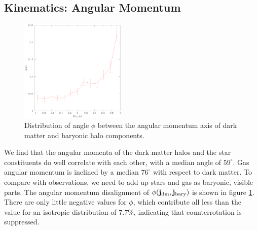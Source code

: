 \documentclass[useAMS,usenatbib]{mn2e}
\begin{document}
\subsection{Kinematics: Angular Momentum}
%
%
\begin{figure}
  \begin{center}
    \includegraphics[width=0.45\textwidth]{fig/j_db/out.eps}
  \end{center}

  \caption{ \label{fig:j_db} Distribution of angle $\phi$ between the angular
    momentum axis of dark matter and baryonic halo components.}
\end{figure}
%
%
We find that the angular momenta of the dark matter halos and the star
constituents do well correlate with each other, with a median angle of
$59^\circ$. Gas angular momentum is inclined by a median $76^\circ$ with
respect to dark matter. To compare with observations, we need to add up stars
and gas as baryonic, visible parts. The angular momentum disalignment of
$\phi(\mathbf{j}_{\rm dm},\mathbf{j}_{\rm bary})$ is shown in figure
\ref{fig:j_db}. There are only little negative values for $\phi$, which
contribute all less than the value for an isotropic distribution of $7.7\%$,
indicating that counterrotation is suppressed.
\end{document}
